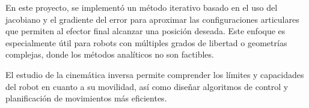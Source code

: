 En este proyecto, se implementó un método iterativo basado en el uso del jacobiano y el gradiente del error para aproximar las configuraciones articulares que permiten al efector final alcanzar una posición deseada. Este enfoque es especialmente útil para robots con múltiples grados de libertad o geometrías complejas, donde los métodos analíticos no son factibles.

El estudio de la cinemática inversa permite comprender los límites y capacidades del robot en cuanto a su movilidad, así como diseñar algoritmos de control y planificación de movimientos más eficientes.


